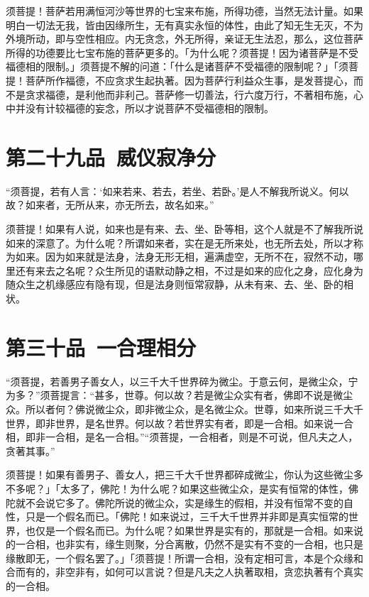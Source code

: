 \documentclass[12pt,twoside,openany]{book}
\newcommand{\kai}[1]{{\CJKfamily{kai}#1}}
\begin{document}
\kai{须菩提！菩萨若用满恒河沙等世界的七宝来布施，所得功德，当然无法计量。如果明白一切法无我，皆由因缘所生，无有真实永恒的体性，由此了知无生无灭，不为外境所动，即与空性相应。内无贪念，外无所得，亲证无生法忍，那么，这位菩萨所得的功德要比七宝布施的菩萨更多的。「为什么呢？须菩提！因为诸菩萨是不受福德相的限制。」须菩提不解的问道：「什么是诸菩萨不受福德的限制呢？」「须菩提！菩萨所作福德，不应贪求生起执著。因为菩萨行利益众生事，是发菩提心，而不是贪求福德，是利他而非利己。菩萨修一切善法，行六度万行，不著相布施，心中并没有计较福德的妄念，所以才说菩萨不受福德相的限制。}


\chapter{第二十九品\ 威仪寂净分}
\begin{pinyinscope}
“须菩提，若有人言：‘如来若来、若去，若坐、若卧。’是人不解我所说义。何以故？如来者，无所从来，亦无所去，故名如来。”
\end{pinyinscope}

\kai{须菩提！如果有人说，如来也是有来、去、坐、卧等相，这个人就是不了解我所说如来的深意了。为什么呢？所谓如来者，实在是无所来处，也无所去处，所以才称为如来。因为如来就是法身，法身无形无相，遍满虚空，无所不在，寂然不动，哪里还有来去之名呢？众生所见的语默动静之相，不过是如来的应化之身，应化身为随众生之机缘感应有隐有现，但是法身则恒常寂静，从未有来、去、坐、卧的相状。}

\chapter{第三十品\ 一合理相分}
\begin{pinyinscope}
“须菩提，若善男子善女人，以三千大千世界碎为微尘。于意云何，是微尘众，宁为多？”须菩提言：“甚多，世尊。何以故？若是微尘众实有者，佛即不说是微尘众。所以者何？佛说微尘众，即非微尘众，是名微尘众。世尊，如来所说三千大千世界，即非世界，是名世界。何以故？若世界实有者，即是一合相。如来说一合相，即非一合相，是名一合相。”“须菩提，一合相者，则是不可说，但凡夫之人，贪著其事。”
\end{pinyinscope}

\kai{须菩提！如果有善男子、善女人，把三千大千世界都碎成微尘，你认为这些微尘多不多呢？」「太多了，佛陀！为什么呢？如果这些微尘众，是实有恒常的体性，佛陀就不会说它多了。佛陀所说的微尘众，实是缘生的假相，并没有恒常不变的自性，只是一个假名而已。「佛陀！如来说过，三千大千世界并非即是真实恒常的世界，也仅是一个假名而已。为什么呢？如果世界是实有的，那就是一合相。如来说的一合相，也非实有，缘生则聚，分合离散，仍然不是实有不变的一合相，也只是缘散即无，一个假名罢了。」「须菩提！所谓一合相，没有定相可言，本是个众缘和合而有的，非空非有，如何可以言说？但是凡夫之人执著取相，贪恋执著有个真实的一合相。}
\end{document}
